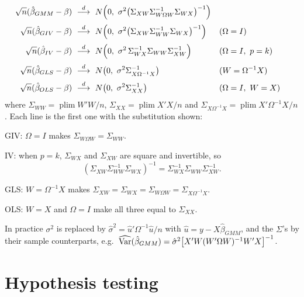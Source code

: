 \documentclass[11pt]{article}
\begin{document}
\begin{align*}
 \sqrt n(\hat\beta_{GMM}-\beta)&\ \overset{d}{\longrightarrow}\ N\Bigl(0,\ \sigma^{2}\bigl(\Sigma_{XW}\Sigma_{W\Omega W}^{-1}\Sigma_{WX}\bigr)^{-1}\Bigr)\\[2pt]
 \sqrt n(\hat\beta_{GIV}-\beta)&\ \overset{d}{\longrightarrow}\ N\Bigl(0,\ \sigma^{2}\bigl(\Sigma_{XW}\Sigma_{WW}^{-1}\Sigma_{WX}\bigr)^{-1}\Bigr)
   &&(\Omega=I)\\[2pt]
 \sqrt n(\hat\beta_{IV}-\beta)&\ \overset{d}{\longrightarrow}\ N\Bigl(0,\ \sigma^{2}\,\Sigma_{WX}^{-1}\Sigma_{WW}\Sigma_{XW}^{-1}\Bigr)
   &&(\Omega=I,\ p=k)\\[2pt]
 \sqrt n(\hat\beta_{GLS}-\beta)&\ \overset{d}{\longrightarrow}\ N\bigl(0,\ \sigma^{2}\Sigma_{X\Omega^{-1}X}^{-1}\bigr)
   &&(W=\Omega^{-1}X)\\[2pt]
 \sqrt n(\hat\beta_{OLS}-\beta)&\ \overset{d}{\longrightarrow}\ N\bigl(0,\ \sigma^{2}\Sigma_{XX}^{-1}\bigr)
   &&(\Omega=I,\ W=X)
\end{align*}
where $\Sigma_{WW}=\operatorname{plim}W'W/n$, $\Sigma_{XX}=\operatorname{plim}X'X/n$ and
$\Sigma_{X\Omega^{-1}X}=\operatorname{plim}X'\Omega^{-1}X/n$. Each line is the first one with the substitution shown:
\begin{flatlist}
 \item GIV: $\Omega=I$ makes $\Sigma_{W\Omega W}=\Sigma_{WW}$.
 \item IV: when $p=k$, $\Sigma_{WX}$ and $\Sigma_{XW}$ are square and invertible, so
       \[ (\Sigma_{XW}\Sigma_{WW}^{-1}\Sigma_{WX})^{-1}=\Sigma_{WX}^{-1}\Sigma_{WW}\Sigma_{XW}^{-1}. \]
 \item GLS: $W=\Omega^{-1}X$ makes $\Sigma_{XW}=\Sigma_{WX}=\Sigma_{W\Omega W}=\Sigma_{X\Omega^{-1}X}$.
 \item OLS: $W=X$ and $\Omega=I$ make all three equal to $\Sigma_{XX}$.
\end{flatlist}
In practice $\sigma^{2}$ is replaced by $\hat\sigma^{2}=\hat u'\Omega^{-1}\hat u/n$ with $\hat u=y-X\hat\beta_{GMM}$, and the
$\Sigma$'s by their sample counterparts, e.g.\
$\widehat{\operatorname{Var}}(\hat\beta_{GMM})=\hat\sigma^{2}\bigl[X'W(W'\Omega W)^{-1}W'X\bigr]^{-1}$.

\section{Hypothesis testing}\label{sec:tests}
\end{document}
